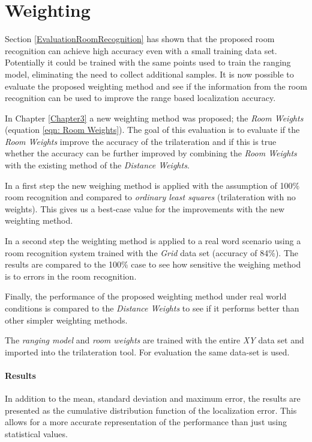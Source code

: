 \newpage

\section{Weighting}
\label{EvaluationWeighting}

Section \ref{EvaluationRoomRecognition} has shown that the proposed room recognition can achieve high accuracy even with a small training data set. Potentially it could be trained with the same points used to train the ranging model, eliminating the need to collect additional samples. It is now possible to evaluate the proposed weighting method and see if the information from the room recognition can be used to improve the range based localization accuracy.

In Chapter \ref{Chapter3} a new weighting method was proposed; the \emph{Room Weights} (equation \ref{eqn: Room Weights}). The goal of this evaluation is to evaluate if the \emph{Room Weights} improve the accuracy of the trilateration and if this is true whether the accuracy can be further improved by combining the \emph{Room Weights} with the existing method of the \emph{Distance Weights}.

In a first step the new weighing method is applied with the assumption of 100\% room recognition and compared to \emph{ordinary least squares} (trilateration with no weights). This gives us a best-case value for the improvements with the new weighting method.

In a second step the weighting method is applied to a real word scenario using a room recognition system trained with the \emph{Grid} data set (accuracy of 84\%). The results are compared to the 100\% case to see how sensitive the weighing method is to errors in the room recognition.

Finally, the performance of the proposed weighting method under real world conditions is compared to the \emph{Distance Weights} to see if it performs better than other simpler weighting methods.

The \emph{ranging model} and \emph{room weights} are trained with the entire \emph{XY} data set and imported into the trilateration tool. For evaluation the same data-set is used.

\paragraph{Results}
In addition to the mean, standard deviation and maximum error, the results are presented as the cumulative distribution function of the localization error. This allows for a more accurate representation of the performance than just using statistical values.

